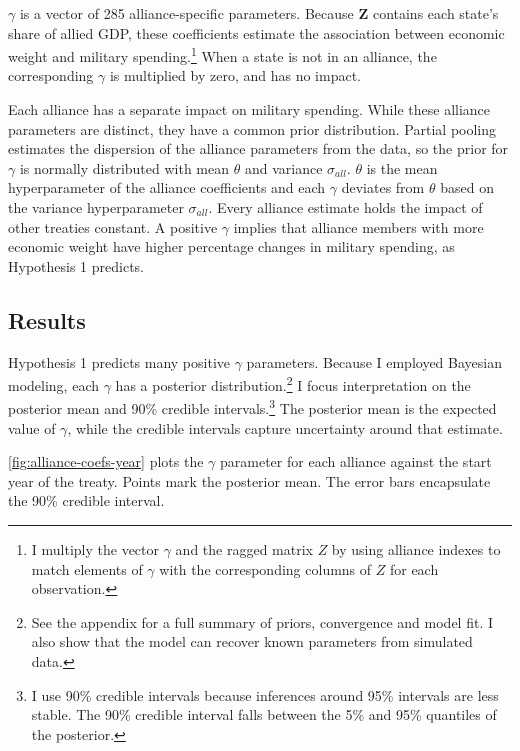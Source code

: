 \documentclass[12pt]{article}
\begin{document}
$\gamma$ is a vector of 285 alliance-specific parameters.  
Because \textbf{Z} contains each state's share of allied GDP, these coefficients estimate the association between economic weight and military spending.\footnote{I multiply the vector $\gamma$ and the ragged matrix $Z$ by using alliance indexes to match elements of $\gamma$ with the corresponding columns of $Z$ for each observation.} 
When a state is not in an alliance, the corresponding $\gamma$ is multiplied by zero, and has no impact. 


Each alliance has a separate impact on military spending.
While these alliance parameters are distinct, they have a common prior distribution.
Partial pooling estimates the dispersion of the alliance parameters from the data, so the prior for $\gamma$ is normally distributed with mean $\theta$ and variance $\sigma_{all}$. 
$\theta$ is the mean hyperparameter of the alliance coefficients and each $\gamma$ deviates from $\theta$ based on the variance hyperparameter $\sigma_{all}$.
Every alliance estimate holds the impact of other treaties constant. 
A positive $\gamma$ implies that alliance members with more economic weight have higher percentage changes in military spending, as Hypothesis 1 predicts. 
    


\subsection{Results} 


Hypothesis 1 predicts many positive $\gamma$ parameters. 
Because I employed Bayesian modeling, each $\gamma$ has a posterior distribution.\footnote{See the appendix for a full summary of priors, convergence and model fit. I also show that the model can recover known parameters from simulated data.} 
I focus interpretation on the posterior mean and 90\% credible intervals.\footnote{I use 90\% credible intervals because inferences around 95\% intervals are less stable. The 90\% credible interval falls between the 5\% and 95\% quantiles of the posterior.}
The posterior mean is the expected value of $\gamma$, while the credible intervals capture uncertainty around that estimate.  


\autoref{fig:alliance-coefs-year} plots the $\gamma$ parameter for each alliance against the start year of the treaty.
Points mark the posterior mean. 
The error bars encapsulate the 90\% credible interval.
\end{document}
